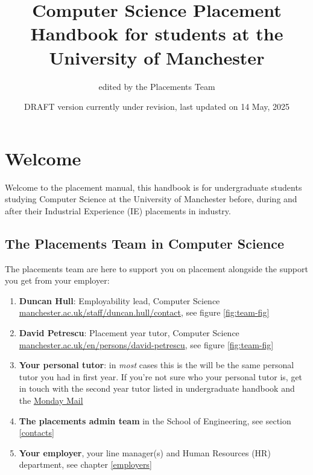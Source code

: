 \documentclass[
]{book}
\title{Computer Science Placement Handbook for students at the University of Manchester}
\author{edited by the Placements Team}
\date{DRAFT version currently under revision, last updated on 14 May, 2025}
\providecommand{\tightlist}{%
  \setlength{\itemsep}{0pt}\setlength{\parskip}{0pt}}
\begin{document}
\maketitle

{
\setcounter{tocdepth}{1}
\tableofcontents
}
\chapter*{Welcome}\label{welcome}

Welcome to the placement manual, this handbook is for undergraduate students studying Computer Science at the University of Manchester before, during and after their Industrial Experience (IE) placements in industry.

\section{The Placements Team in Computer Science}\label{team}

The placements team are here to support you on placement alongside the support you get from your employer:

\begin{enumerate}
\def\labelenumi{\arabic{enumi}.}
\tightlist
\item
  \textbf{Duncan Hull}: Employability lead, Computer Science \href{https://personalpages.manchester.ac.uk/staff/duncan.hull/contact}{manchester.ac.uk/staff/duncan.hull/contact}, see figure \ref{fig:team-fig}
\item
  \textbf{David Petrescu}: Placement year tutor, Computer Science \href{https://research.manchester.ac.uk/en/persons/david-petrescu}{manchester.ac.uk/en/persons/david-petrescu}, see figure \ref{fig:team-fig}
\item
  \textbf{Your personal tutor}: in \emph{most} cases this is the will be the same personal tutor you had in first year. If you're not sure who your personal tutor is, get in touch with the second year tutor listed in undergraduate handbook \citep{ughandbook} and the \href{https://studentnet.cs.manchester.ac.uk/ugt/mondaymail/}{Monday Mail} \citep{mondaymail}
\item
  \textbf{The placements admin team} in the School of Engineering, see section \ref{contacts}
\item
  \textbf{Your employer}, your line manager(s) and Human Resources (HR) department, see chapter \ref{employers}
\end{enumerate}
\end{document}
